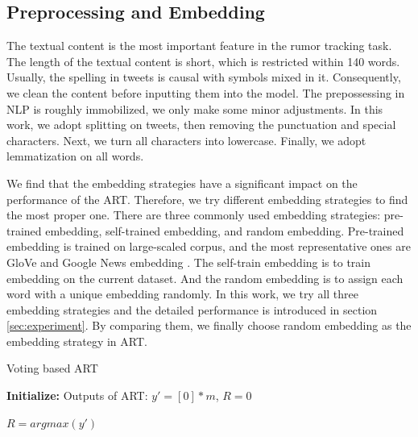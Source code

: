 \subsection{Preprocessing and Embedding}
\label{sec:process_embedding}
The textual content is the most important feature in the rumor tracking task. The length of the textual content is short, which is restricted within 140 words. Usually, the spelling in tweets is causal with symbols mixed in it. Consequently, we clean the content before inputting them into the model. The prepossessing in NLP is roughly immobilized, we only  make some minor adjustments. In this work, we adopt splitting on tweets, then removing the punctuation and special characters. Next, we turn all characters into lowercase. Finally, we adopt lemmatization on all words.

We find that the embedding strategies have a significant impact on the performance of the ART. Therefore, we try different embedding strategies to find the most proper one. There are three commonly used embedding strategies: pre-trained embedding, self-trained embedding, and random embedding. Pre-trained embedding is trained on large-scaled corpus, and the most representative ones are GloVe \cite{DBLP:conf/emnlp/PenningtonSM14} and Google News embedding \cite{googlenews}. The self-train embedding is to train embedding on the current dataset. And the random embedding is to assign each word with a unique embedding randomly. In this work, we try all three embedding strategies and the detailed performance is introduced in section \ref{sec:experiment}. By comparing them, we finally choose random embedding as the embedding strategy in ART.

\begin{algorithm}[tbp]
	\caption{Voting based ART}
	\label{algorithm:art}
	\LinesNumbered %
	\textbf{Initialize:} Outputs of ART: $y' = [0]*m$, $R = 0$ \;
	
	
	$R = argmax(y')$
\end{algorithm}


